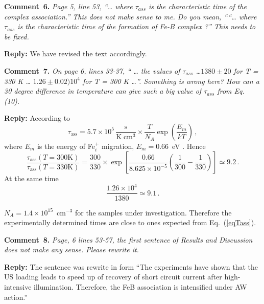 \documentclass[sn-mathphys]{sn-jnl}
\begin{document}
\vspace{1cm}
\noindent
\textcolor[rgb]{0.00,0.50,1.00}{\textbf{Comment~6.}}
\emph{Page 5, line 53, “… where $\tau_{ass}$ is the characteristic time of the complex association.”
This does not make sense to me.
Do you mean, ““… where $\tau_{ass}$ is the characteristic time of the formation of Fe-B complex ?” This needs to be fixed.}

\noindent
\textcolor[rgb]{0.51,0.00,0.00}{\textbf{Reply:}}
We have revised the text accordingly.


\vspace{1cm}
\noindent
\textcolor[rgb]{0.00,0.50,1.00}{\textbf{Comment~7.}}
\emph{On page 6, lines 33-37, “ … the values of $\tau_{ass}$ …$1380 \pm20$  for T = 330 K … $1.26 \pm0.02) 10^4$  for T = 300 K …”.
Something is wrong here?
How can a 30 degree difference in temperature can give such a big value of $\tau_{ass}$ from Eq. (10).}

\noindent
\textcolor[rgb]{0.51,0.00,0.00}{\textbf{Reply:}}
According to \cite{FeBKin2019,FeBAssJAP2014,FeBAssSST2011}
\begin{equation}
\label{eqTass}
\tau_\mathrm{ass}=5.7\times10^5\,\frac{\mathrm{s}}{\mathrm{K}\;\mathrm{cm}^3}\times\frac{T}{N_A}\exp\left(\frac{E_m}{kT}\right)\,,
\end{equation}
where
$E_m$ is the energy of Fe$_i^+$ migration, $E_m=0.66$~eV \cite{FeBAssJAP2014,FeBkinAPL2008,FeBKin2019,FeBAssSST2011}.
Hence
\begin{equation}
\frac{\tau_\mathrm{ass}(T=300 \mathrm{K})}{\tau_\mathrm{ass}(T=330 \mathrm{K})}=
\frac{300}{330}\times \exp\left[\frac{0.66}{8.625\times10^{-5}}\left(\frac{1}{300}-\frac{1}{330}\right)\right]\simeq9.2\,.
\end{equation}
At the same time
\begin{equation}
\frac{1.26\times10^4}{1380}\simeq9.1\,.
\end{equation}

$N_A=1.4\times10^{15}$~cm$^{-3}$ for the samples under investigation.
Therefore the experimentally determined times are close to ones expected from Eq.~(\ref{eqTass}).




\vspace{1cm}
\noindent
\textcolor[rgb]{0.00,0.50,1.00}{\textbf{Comment~8.}}
\emph{Page, 6 lines 53-57, the first sentence of Results and Discussion does not make any sense.
Please rewrite it.}

\noindent
\textcolor[rgb]{0.51,0.00,0.00}{\textbf{Reply:}}
The sentence was rewrite in form
``The experiments have shown that the US loading leads to
speed up of recovery of short circuit current after high-intensive illumination.
Therefore, the  FeB association is intensified under AW action.''
\end{document}
